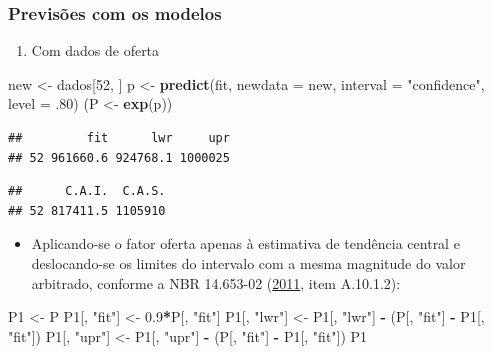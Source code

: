 \documentclass{article}
\newenvironment{Shaded}{\begin{snugshade}}{\end{snugshade}}
\newcommand{\DataTypeTok}[1]{\textcolor[rgb]{0.13,0.29,0.53}{#1}}
\newcommand{\DecValTok}[1]{\textcolor[rgb]{0.00,0.00,0.81}{#1}}
\newcommand{\FloatTok}[1]{\textcolor[rgb]{0.00,0.00,0.81}{#1}}
\newcommand{\KeywordTok}[1]{\textcolor[rgb]{0.13,0.29,0.53}{\textbf{#1}}}
\newcommand{\NormalTok}[1]{#1}
\newcommand{\OperatorTok}[1]{\textcolor[rgb]{0.81,0.36,0.00}{\textbf{#1}}}
\newcommand{\StringTok}[1]{\textcolor[rgb]{0.31,0.60,0.02}{#1}}
\begin{document}
\hypertarget{previsuxf5es-com-os-modelos}{%
\subsubsection{Previsões com os
modelos}\label{previsuxf5es-com-os-modelos}}

\begin{enumerate}
\def\labelenumi{\alph{enumi}.}
\tightlist
\item
  Com dados de oferta
\end{enumerate}

\begin{Shaded}
\begin{Highlighting}[]
\NormalTok{new <-}\StringTok{ }\NormalTok{dados[}\DecValTok{52}\NormalTok{, ]}
\NormalTok{p <-}\StringTok{ }\KeywordTok{predict}\NormalTok{(fit, }\DataTypeTok{newdata =}\NormalTok{ new, }\DataTypeTok{interval =} \StringTok{"confidence"}\NormalTok{, }\DataTypeTok{level =} \FloatTok{.80}\NormalTok{)}
\NormalTok{(P <-}\StringTok{ }\KeywordTok{exp}\NormalTok{(p))}
\end{Highlighting}
\end{Shaded}

\begin{verbatim}
##         fit      lwr     upr
## 52 961660.6 924768.1 1000025
\end{verbatim}

\begin{verbatim}
##      C.A.I.  C.A.S.
## 52 817411.5 1105910
\end{verbatim}

\begin{itemize}
\tightlist
\item
  Aplicando-se o fator oferta apenas à estimativa de tendência central e
  deslocando-se os limites do intervalo com a mesma magnitude do valor
  arbitrado, conforme a NBR 14.653-02
  (\protect\hyperlink{ref-NBR1465302}{2011}, item A.10.1.2):
\end{itemize}

\begin{Shaded}
\begin{Highlighting}[]
\NormalTok{P1 <-}\StringTok{ }\NormalTok{P}
\NormalTok{P1[, }\StringTok{"fit"}\NormalTok{] <-}\StringTok{ }\FloatTok{0.9}\OperatorTok{*}\NormalTok{P[, }\StringTok{"fit"}\NormalTok{]}
\NormalTok{P1[, }\StringTok{"lwr"}\NormalTok{] <-}\StringTok{ }\NormalTok{P1[, }\StringTok{"lwr"}\NormalTok{] }\OperatorTok{-}\StringTok{ }\NormalTok{(P[, }\StringTok{"fit"}\NormalTok{] }\OperatorTok{-}\StringTok{ }\NormalTok{P1[, }\StringTok{"fit"}\NormalTok{])}
\NormalTok{P1[, }\StringTok{"upr"}\NormalTok{] <-}\StringTok{ }\NormalTok{P1[, }\StringTok{"upr"}\NormalTok{] }\OperatorTok{-}\StringTok{ }\NormalTok{(P[, }\StringTok{"fit"}\NormalTok{] }\OperatorTok{-}\StringTok{ }\NormalTok{P1[, }\StringTok{"fit"}\NormalTok{])}
\NormalTok{P1}
\end{Highlighting}
\end{Shaded}
\end{document}
